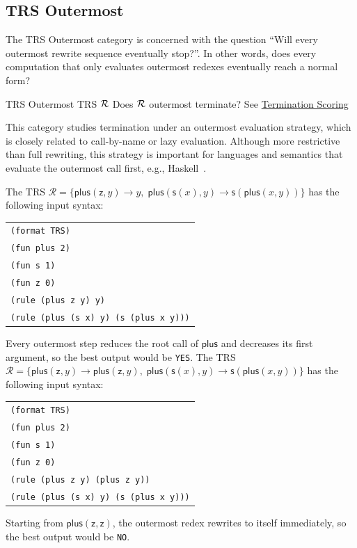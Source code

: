\subsection{TRS Outermost}

The TRS Outermost category is concerned with the question ``Will every outermost rewrite sequence eventually stop?''. 
In other words, does every computation that only evaluates outermost redexes eventually reach a normal form? 

\begin{formalproblem}
  {TRS Outermost}
  {TRS $\mathcal{R}$}
  {Does $\mathcal{R}$ outermost terminate?}
  {See \hyperref[scoring_termination]{Termination Scoring}}
\end{formalproblem}

\begin{motivation}
This category studies termination under an outermost evaluation strategy, 
which is closely related to call-by-name or lazy evaluation.
Although more restrictive than full rewriting, this strategy is important for languages 
and semantics that evaluate the outermost call first, e.g., \textsf{Haskell}~\cite{hudak1992ReportProgrammingLanguage}.
\end{motivation}

\begin{example}
The TRS $\mathcal{R} = \{\mathsf{plus}(\mathsf{z}, y) \to y,\; 
\mathsf{plus}(\mathsf{s}(x), y) \to \mathsf{s}(\mathsf{plus}(x,y))\}$ has the following input syntax:
\begin{center}
\begin{tabular}{l}
\texttt{(format TRS)} \\
\texttt{(fun plus 2)} \\
\texttt{(fun s 1)} \\
\texttt{(fun z 0)} \\
\texttt{(rule (plus z y) y)} \\
\texttt{(rule (plus (s x) y) (s (plus x y)))}
\end{tabular}
\end{center}
Every outermost step reduces the root call of $\mathsf{plus}$ and decreases its first argument, so the best output would be \texttt{YES}.
The TRS $\mathcal{R} = \{\mathsf{plus}(\mathsf{z}, y) \to \mathsf{plus}(\mathsf{z}, y),\; 
\mathsf{plus}(\mathsf{s}(x), y) \to \mathsf{s}(\mathsf{plus}(x,y))\}$ has the following input syntax:
\begin{center}
\begin{tabular}{l}
\texttt{(format TRS)} \\
\texttt{(fun plus 2)} \\
\texttt{(fun s 1)} \\
\texttt{(fun z 0)} \\
\texttt{(rule (plus z y) (plus z y))} \\
\texttt{(rule (plus (s x) y) (s (plus x y)))}
\end{tabular}
\end{center}
Starting from $\mathsf{plus}(\mathsf{z},\mathsf{z})$, the outermost redex rewrites to itself immediately, so the best output would be \texttt{NO}.
\end{example}

